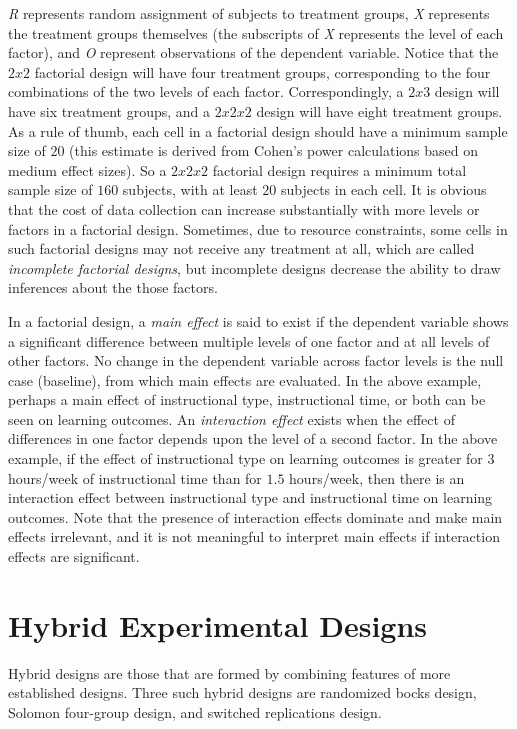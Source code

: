 \textit{R} represents random assignment of subjects to treatment groups, \textit{X} represents the treatment groups themselves (the subscripts of \textit{X} represents the level of each factor), and \textit{O} represent observations of the dependent variable. Notice that the $ 2 x 2 $ factorial design will have four treatment groups, corresponding to the four combinations of the two levels of each factor. Correspondingly, a $ 2 x 3 $ design will have six treatment groups, and a $ 2 x 2 x 2 $ design will have eight treatment groups. As a rule of thumb, each cell in a factorial design should have a minimum sample size of $ 20 $ (this estimate is derived from Cohen's power calculations based on medium effect sizes). So a $ 2 x 2 x 2 $ factorial design requires a minimum total sample size of $ 160 $ subjects, with at least $ 20 $ subjects in each cell. It is obvious that the cost of data collection can increase substantially with more levels or factors in a factorial design. Sometimes, due to resource constraints, some cells in such factorial designs may not receive any treatment at all, which are called \textit{incomplete factorial designs}, but incomplete designs decrease the ability to draw inferences about the those factors.

In a factorial design, a \textit{main effect} is said to exist if the dependent variable shows a significant difference between multiple levels of one factor and at all levels of other factors. No change in the dependent variable across factor levels is the null case (baseline), from which main effects are evaluated. In the above example, perhaps a main effect of instructional type, instructional time, or both can be seen on learning outcomes. An \textit{interaction effect} exists when the effect of differences in one factor depends upon the level of a second factor. In the above example, if the effect of instructional type on learning outcomes is greater for $ 3 $ hours/week of instructional time than for $ 1.5 $ hours/week, then there is an interaction effect between instructional type and instructional time on learning outcomes. Note that the presence of interaction effects dominate and make main effects irrelevant, and it is not meaningful to interpret main effects if interaction effects are significant.

\section{Hybrid Experimental Designs}

Hybrid designs are those that are formed by combining features of more established designs. Three such hybrid designs are randomized bocks design, Solomon four-group design, and switched replications design.

